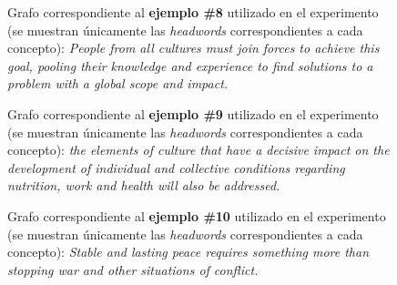 \documentclass[a4paper,12pt,spanish]{book}
\begin{document}
\begin{figure}[htbp]
\centering
\capstart

\caption[Grafo correspondiente a la oración original del ejemplo \#8 utilizado en el experimento.]{Grafo correspondiente al \textbf{ejemplo \#8} utilizado en el experimento (se muestran
únicamente las \emph{headwords} correspondientes a cada concepto): \emph{People from
all cultures must join forces to achieve this goal, pooling their knowledge
and experience to find solutions to a problem with a global scope and impact.}}\label{appendix-data:sample08-original}\end{figure}
\begin{figure}[htbp]
\centering
\capstart

\caption[Grafo correspondiente a la oración original del ejemplo \#9 utilizado en el experimento.]{Grafo correspondiente al \textbf{ejemplo \#9} utilizado en el experimento (se muestran
únicamente las \emph{headwords} correspondientes a cada concepto): \emph{the elements
of culture that have a decisive impact on the development of individual and
collective conditions regarding nutrition, work and health will also be addressed.}}\label{appendix-data:sample09-original}\end{figure}
\begin{figure}[htbp]
\centering
\capstart

\caption[Grafo correspondiente a la oración original del ejemplo \#10 utilizado en el experimento.]{Grafo correspondiente al \textbf{ejemplo \#10} utilizado en el experimento (se muestran
únicamente las \emph{headwords} correspondientes a cada concepto): \emph{Stable and
lasting peace requires something more than stopping war and other situations
of conflict.}}\label{appendix-data:sample10-original}\end{figure}
\clearpage
\end{document}
